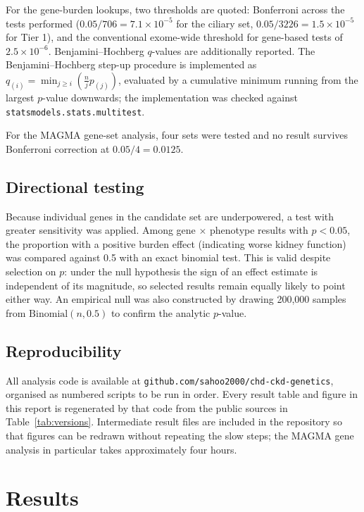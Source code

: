 \documentclass[11pt,a4paper]{article}
\begin{document}
For the gene-burden lookups, two thresholds are quoted: Bonferroni across the tests
performed ($0.05/706 = 7.1\times10^{-5}$ for the ciliary set,
$0.05/3226 = 1.5\times10^{-5}$ for Tier 1), and the conventional exome-wide threshold for
gene-based tests of $2.5\times10^{-6}$. Benjamini--Hochberg $q$-values
\cite{benjamini1995} are additionally reported. The Benjamini--Hochberg step-up procedure is
implemented as $q_{(i)} = \min_{j \geq i}\left(\frac{n}{j}p_{(j)}\right)$, evaluated by a
cumulative minimum running from the largest $p$-value downwards; the implementation was
checked against \texttt{statsmodels.stats.multitest}.

For the MAGMA gene-set analysis, four sets were tested and no result survives Bonferroni
correction at $0.05/4 = 0.0125$.

\subsection{Directional testing}

Because individual genes in the candidate set are underpowered, a test with greater
sensitivity was applied. Among gene $\times$ phenotype results with $p < 0.05$, the
proportion with a positive burden effect (indicating worse kidney function) was compared
against 0.5 with an exact binomial test. This is valid despite selection on $p$: under the
null hypothesis the sign of an effect estimate is independent of its magnitude, so selected
results remain equally likely to point either way. An empirical null was also constructed by
drawing 200,000 samples from $\mathrm{Binomial}(n, 0.5)$ to confirm the analytic $p$-value.

\subsection{Reproducibility}

All analysis code is available at \texttt{github.com/sahoo2000/chd-ckd-genetics}, organised
as numbered scripts to be run in order. Every result table and figure in this report is
regenerated by that code from the public sources in Table~\ref{tab:versions}. Intermediate
result files are included in the repository so that figures can be redrawn without
repeating the slow steps; the MAGMA gene analysis in particular takes approximately four
hours.

\section{Results}
\end{document}

